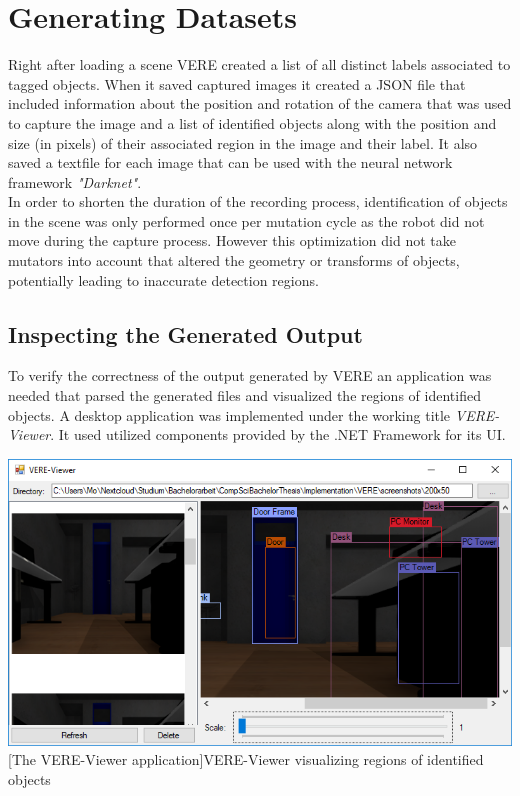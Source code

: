 \section{Generating Datasets}
Right after loading a scene \ac{VERE} created a list of all distinct labels associated to tagged objects. When it saved captured images it created a JSON file that included information about the position and rotation of the camera that was used to capture the image and a list of identified objects along with the position and size (in pixels) of their associated region in the image and their label. It also saved a textfile for each image that can be used with the neural network framework \emph{"Darknet"}.\\
In order to shorten the duration of the recording process, identification of objects in the scene was only performed once per mutation cycle as the robot did not move during the capture process. However this optimization did not take mutators into account that altered the geometry or transforms of objects, potentially leading to inaccurate detection regions.

\subsection{Inspecting the Generated Output}
To verify the correctness of the output generated by \ac{VERE} an application was needed that parsed the generated files and visualized the regions of identified objects. A desktop application was implemented under the working title \emph{VERE-Viewer}. It used utilized components provided by the .NET Framework for its UI.

\begin{center}
\noindent\includegraphics[width=14cm]{tex/img/ch05/VERE_Viewer_Application02.png}
[The VERE-Viewer application]{VERE-Viewer visualizing regions of identified objects}
\label{fig:vere-viewer}
\end{center}

